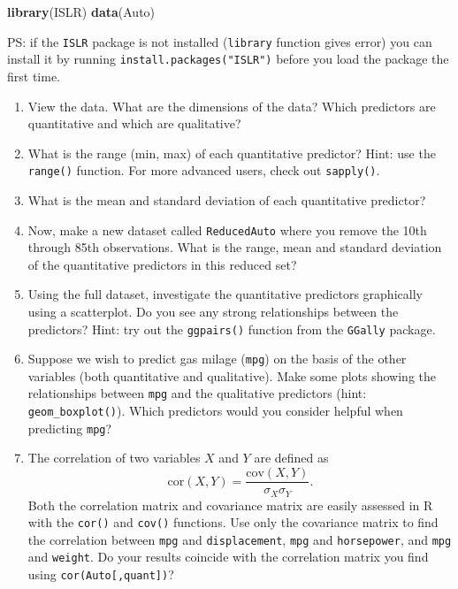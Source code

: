 \documentclass[]{article}
\newenvironment{Shaded}{\begin{snugshade}}{\end{snugshade}}
\newcommand{\KeywordTok}[1]{\textcolor[rgb]{0.13,0.29,0.53}{\textbf{#1}}}
\newcommand{\NormalTok}[1]{#1}
\begin{document}
\begin{Shaded}
\begin{Highlighting}[]
\KeywordTok{library}\NormalTok{(ISLR)}
\KeywordTok{data}\NormalTok{(Auto)}
\end{Highlighting}
\end{Shaded}

PS: if the \texttt{ISLR} package is not installed (\texttt{library}
function gives error) you can install it by running
\texttt{install.packages("ISLR")} before you load the package the first
time.

\begin{enumerate}
\def\labelenumi{\alph{enumi})}
\item
  View the data. What are the dimensions of the data? Which predictors
  are quantitative and which are qualitative?
\item
  What is the range (min, max) of each quantitative predictor? Hint: use
  the \texttt{range()} function. For more advanced users, check out
  \texttt{sapply()}.
\item
  What is the mean and standard deviation of each quantitative
  predictor?
\item
  Now, make a new dataset called \texttt{ReducedAuto} where you remove
  the 10th through 85th observations. What is the range, mean and
  standard deviation of the quantitative predictors in this reduced set?
\item
  Using the full dataset, investigate the quantitative predictors
  graphically using a scatterplot. Do you see any strong relationships
  between the predictors? Hint: try out the \texttt{ggpairs()} function
  from the \texttt{GGally} package.
\item
  Suppose we wish to predict gas milage (\texttt{mpg}) on the basis of
  the other variables (both quantitative and qualitative). Make some
  plots showing the relationships between \texttt{mpg} and the
  qualitative predictors (hint: \texttt{geom\_boxplot()}). Which
  predictors would you consider helpful when predicting \texttt{mpg}?
\item
  The correlation of two variables \(X\) and \(Y\) are defined as
  \[ \text{cor}(X,Y) = \frac{\text{cov}(X,Y)}{\sigma_X\sigma_Y}.\] Both
  the correlation matrix and covariance matrix are easily assessed in R
  with the \texttt{cor()} and \texttt{cov()} functions. Use only the
  covariance matrix to find the correlation between \texttt{mpg} and
  \texttt{displacement}, \texttt{mpg} and \texttt{horsepower}, and
  \texttt{mpg} and \texttt{weight}. Do your results coincide with the
  correlation matrix you find using \texttt{cor(Auto{[},quant{]})}?
\end{enumerate}
\end{document}
